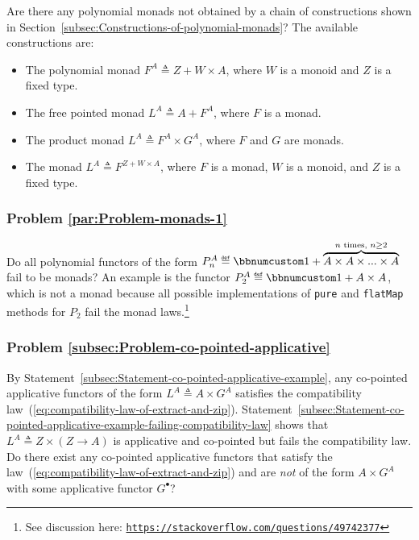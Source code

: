 Are there any polynomial monads not obtained by a chain of constructions
shown in Section~\ref{subsec:Constructions-of-polynomial-monads}?
The available constructions are:
\begin{itemize}
\item The polynomial monad $F^{A}\triangleq Z+W\times A$, where $W$ is
a monoid and $Z$ is a fixed type.
\item The free pointed monad $L^{A}\triangleq A+F^{A}$, where $F$ is a
monad.
\item The product monad $L^{A}\triangleq F^{A}\times G^{A}$, where $F$
and $G$ are monads.
\item The monad $L^{A}\triangleq F^{Z+W\times A}$, where $F$ is a monad,
$W$ is a monoid, and $Z$ is a fixed type.
\end{itemize}

\subsubsection{Problem \label{par:Problem-monads-1}\ref{par:Problem-monads-1}}

Do all polynomial functors of the form $P_{n}^{A}\triangleq\bbnum 1+\overbrace{A\times A\times...\times A}^{n\text{ times, }n\ge2}$
fail to be monads? An example is the functor $P_{2}^{A}\triangleq\bbnum 1+A\times A$,
which is not a monad because all possible implementations of \lstinline!pure!
and \lstinline!flatMap! methods for $P_{2}$ fail the monad laws.\footnote{See discussion here: \texttt{\href{https://stackoverflow.com/questions/49742377}{https://stackoverflow.com/questions/49742377}}}

\subsubsection{Problem \label{subsec:Problem-co-pointed-applicative}\ref{subsec:Problem-co-pointed-applicative}}

By Statement~\ref{subsec:Statement-co-pointed-applicative-example},
any co-pointed applicative functors of the form $L^{A}\triangleq A\times G^{A}$
satisfies the compatibility law~(\ref{eq:compatibility-law-of-extract-and-zip}).
Statement~\ref{subsec:Statement-co-pointed-applicative-example-failing-compatibility-law}
shows that $L^{A}\triangleq Z\times\left(Z\rightarrow A\right)$ is
applicative and co-pointed but fails the compatibility law. Do there
exist any co-pointed applicative functors that satisfy the law~(\ref{eq:compatibility-law-of-extract-and-zip})
and are \emph{not} of the form $A\times G^{A}$ with some applicative
functor $G^{\bullet}$? 

